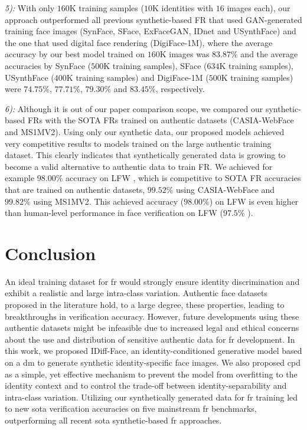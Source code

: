 \documentclass[10pt,twocolumn,letterpaper]{article}
\newcommand{\approachnamewithoutspace}{IDiff-Face}
\begin{document}
\textit{5):} With only $160$K training samples ($10$K identities with $16$ images each), our approach outperformed all previous synthetic-based FR that used GAN-generated training face images (SynFace, SFace, ExFaceGAN, IDnet and USynthFace) and the one that used digital face rendering (DigiFace-1M), where the average accuracy by our best model trained on $160$K images was $83.87\%$ and the average accuracies by SynFace ($500$K training samples), SFace ($634$K training samples), USynthFace ($400$K training samples) and DigiFace-1M ($500$K training samples) were $74.75\%$, $77.71\%$, $79.30\%$ and $83.45\%$, respectively.


\textit{6):} Although it is out of our paper comparison scope, we compared our synthetic-based FRs with the SOTA FRs trained on authentic datasets (CASIA-WebFace and MS1MV2).  Using only our synthetic data, our proposed models achieved very competitive results to models trained on the large authentic training dataset. This clearly indicates that synthetically generated data is growing to become a valid alternative to authentic data to train FR. We achieved for example $98.00\%$ accuracy on LFW \cite{LFWDatabase}, which is competitive to SOTA FR accuracies that are trained on authentic datasets, $99.52\%$ using CASIA-WebFace and $99.82\%$ using MS1MV2. This achieved accuracy ($98.00\%$) on LFW is even higher than human-level performance in face verification on LFW ($97.5\%$ \cite{DBLP:conf/iccv/KumarBBN09}).





\vspace{-3mm}
\section{Conclusion}
\vspace{-1mm}
An ideal training dataset for \acrshort{fr} would strongly ensure identity discrimination and exhibit a realistic and large intra-class variation. Authentic face datasets proposed in the literature hold, to a large degree, these properties, leading to breakthroughs in verification accuracy. However, future developments using these authentic datasets might be infeasible due to increased legal and ethical concerns about the use and distribution of sensitive authentic data for \acrshort{fr} development. In this work, we proposed \approachnamewithoutspace, an identity-conditioned generative model based on a \acrshort{dm} to generate synthetic identity-specific face images. We also proposed \acrshort{cpd} as a simple, yet effective mechanism to prevent the model from overfitting to the identity context and to control the trade-off between identity-separability and intra-class variation.
Utilizing our synthetically generated data for \acrshort{fr} training led to new \acrshort{sota} verification accuracies on five mainstream \acrshort{fr} benchmarks, outperforming all recent \acrshort{sota} synthetic-based \acrshort{fr} approaches.
\end{document}

